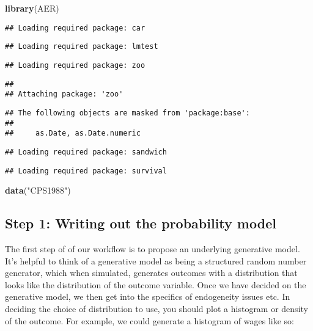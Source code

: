\documentclass[]{book}
\newenvironment{Shaded}{\begin{snugshade}}{\end{snugshade}}
\newcommand{\KeywordTok}[1]{\textcolor[rgb]{0.13,0.29,0.53}{\textbf{{#1}}}}
\newcommand{\StringTok}[1]{\textcolor[rgb]{0.31,0.60,0.02}{{#1}}}
\newcommand{\NormalTok}[1]{{#1}}
\begin{document}
\begin{Shaded}
\begin{Highlighting}[]
\KeywordTok{library}\NormalTok{(AER)}
\end{Highlighting}
\end{Shaded}

\begin{verbatim}
## Loading required package: car
\end{verbatim}

\begin{verbatim}
## Loading required package: lmtest
\end{verbatim}

\begin{verbatim}
## Loading required package: zoo
\end{verbatim}

\begin{verbatim}
## 
## Attaching package: 'zoo'
\end{verbatim}

\begin{verbatim}
## The following objects are masked from 'package:base':
## 
##     as.Date, as.Date.numeric
\end{verbatim}

\begin{verbatim}
## Loading required package: sandwich
\end{verbatim}

\begin{verbatim}
## Loading required package: survival
\end{verbatim}

\begin{Shaded}
\begin{Highlighting}[]
\KeywordTok{data}\NormalTok{(}\StringTok{"CPS1988"}\NormalTok{)}
\end{Highlighting}
\end{Shaded}

\subsection{Step 1: Writing out the probability
model}\label{step-1-writing-out-the-probability-model}

The first step of of our workflow is to propose an underlying generative
model. It's helpful to think of a generative model as being a structured
random number generator, which when simulated, generates outcomes with a
distribution that looks like the distribution of the outcome variable.
Once we have decided on the generative model, we then get into the
specifics of endogeneity issues etc. In deciding the choice of
distribution to use, you should plot a histogram or density of the
outcome. For example, we could generate a histogram of wages like so:
\end{document}

